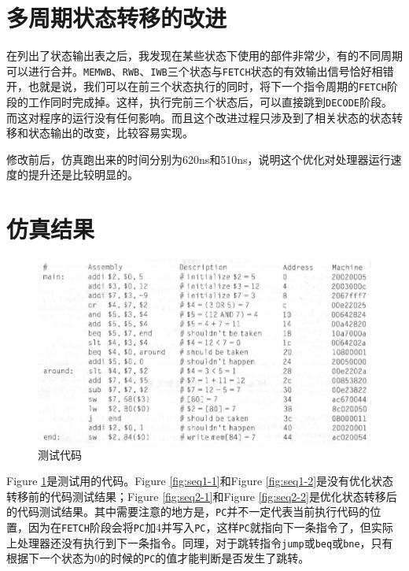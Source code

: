 \documentclass[12pt,a4paper]{article}
\newcommand{\incode}[1]{\texttt{#1}} %
\begin{document}
\section{多周期状态转移的改进}

在列出了状态输出表之后，我发现在某些状态下使用的部件非常少，有的不同周期可以进行合并。\incode{MEMWB}、\incode{RWB}、\incode{IWB}三个状态与\incode{FETCH}状态的有效输出信号恰好相错开，也就是说，我们可以在前三个状态执行的同时，将下一个指令周期的\incode{FETCH}阶段的工作同时完成掉。这样，执行完前三个状态后，可以直接跳到\incode{DECODE}阶段。而这对程序的运行没有任何影响。而且这个改进过程只涉及到了相关状态的状态转移和状态输出的改变，比较容易实现。

修改前后，仿真跑出来的时间分别为620ns和510ns，说明这个优化对处理器运行速度的提升还是比较明显的。

\section{仿真结果}

\begin{figure}[h]
	\centering
	\includegraphics[width=\textwidth]{code}
	\caption{测试代码}
	\label{fig:code}
\end{figure}

Figure \ref{fig:code}是测试用的代码。Figure \ref{fig:seq1-1}和Figure \ref{fig:seq1-2}是没有优化状态转移前的代码测试结果；Figure \ref{fig:seq2-1}和Figure \ref{fig:seq2-2}是优化状态转移后的代码测试结果。其中需要注意的地方是，\incode{PC}并不一定代表当前执行代码的位置，因为在\incode{FETCH}阶段会将\incode{PC}加4并写入\incode{PC}，这样\incode{PC}就指向下一条指令了，但实际上处理器还没有执行到下一条指令。同理，对于跳转指令\incode{jump}或\incode{beq}或\incode{bne}，只有根据下一个状态为0的时候的\incode{PC}的值才能判断是否发生了跳转。
\end{document}
